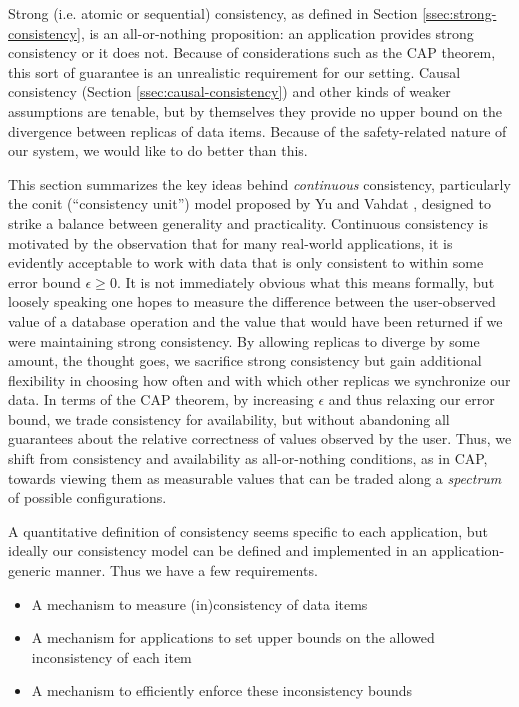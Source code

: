 \documentclass[]             %
{NASA}                       %
\theoremstyle{definition}
\providecommand{\tightlist}{%
  \setlength{\itemsep}{0pt}\setlength{\parskip}{0pt}}
\begin{document}
Strong (i.e. atomic or sequential) consistency, as defined in Section
\ref{ssec:strong-consistency}, is an all-or-nothing proposition: an
application provides strong consistency or it does not. Because of
considerations such as the CAP theorem, this sort of guarantee is an
unrealistic requirement for our setting. Causal consistency (Section
\ref{ssec:causal-consistency}) and other kinds of weaker assumptions
are tenable, but by themselves they provide no upper bound on the
divergence between replicas of data items. Because of the
safety-related nature of our system, we would like to do better than
this.

This section summarizes the key ideas behind \emph{continuous}
consistency, particularly the conit (``consistency unit'') model
proposed by Yu and Vahdat
\cite{2000tact,2000tactalgorithms,10.5555/1251229.1251250,DBLP:conf/icdcs/YuV01,2002tact},
designed to strike a balance between generality and
practicality. Continuous consistency is motivated by the observation
that for many real-world applications, it is evidently acceptable to
work with data that is only consistent to within some error bound
$\epsilon \geq 0$. It is not immediately obvious what this means
formally, but loosely speaking one hopes to measure the difference
between the user-observed value of a database operation and the value
that would have been returned if we were maintaining strong
consistency. By allowing replicas to diverge by some amount, the
thought goes, we sacrifice strong consistency but gain additional
flexibility in choosing how often and with which other replicas we
synchronize our data. In terms of the CAP theorem, by increasing
$\epsilon$ and thus relaxing our error bound, we trade consistency for
availability, but without abandoning all guarantees about the relative
correctness of values observed by the user. Thus, we shift from
consistency and availability as all-or-nothing conditions, as in CAP,
towards viewing them as measurable values that can be traded along a
\emph{spectrum} of possible configurations.

A quantitative definition of consistency seems specific to each
application, but ideally our consistency model can be defined and
implemented in an application-generic manner. Thus we have a few
requirements.
\begin{itemize}
  \tightlist
\item A mechanism to measure (in)consistency of data items
\item A mechanism for applications to set upper bounds on the allowed
  inconsistency of each item
\item A mechanism to efficiently enforce these inconsistency bounds
\end{itemize}
\end{document}
